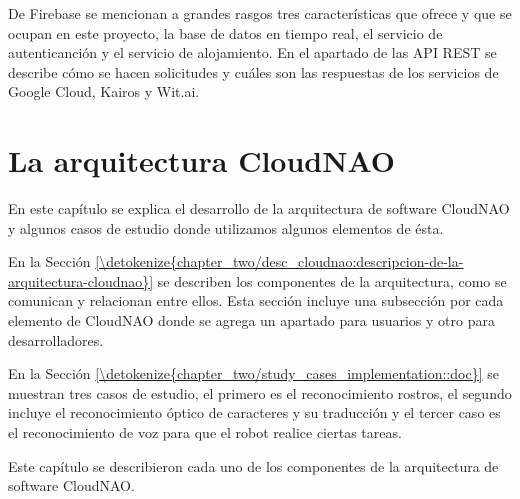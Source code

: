 \documentclass[letterpaper,12pt,spanish]{report}
\begin{document}
De Firebase se mencionan a grandes rasgos 
tres características que ofrece y que se ocupan
en este proyecto, la base de datos en tiempo real,
el servicio de autenticanción y el servicio de alojamiento.
En el apartado de las API REST se describe cómo
se hacen solicitudes y cuáles son las respuestas
de los servicios de Google Cloud, Kairos y Wit.ai.

\chapter{La arquitectura CloudNAO}
\label{\detokenize{chapter_two:la-arquitectura-cloudnao}}\label{\detokenize{chapter_two::doc}}

En este capítulo se explica el desarrollo de la arquitectura de software CloudNAO y algunos casos de estudio donde utilizamos
algunos elementos de ésta.

En la Sección \ref{\detokenize{chapter_two/desc_cloudnao:descripcion-de-la-arquitectura-cloudnao}} se describen los componentes de
la arquitectura, como se comunican y relacionan entre ellos.
Esta sección incluye una subsección por cada elemento de CloudNAO
donde se agrega un apartado para usuarios y otro para desarrolladores.

En la Sección \ref{\detokenize{chapter_two/study_cases_implementation::doc}} se muestran tres casos de estudio, el primero es el 
reconocimiento rostros, el segundo incluye el reconocimiento
óptico de caracteres y su traducción y el tercer caso es
el reconocimiento de voz para que el robot realice ciertas
tareas.



% 
% 
% 
% 
% 
% 
% 
% 

Este capítulo se describieron cada uno de los
componentes de la arquitectura de software CloudNAO.
\end{document}
